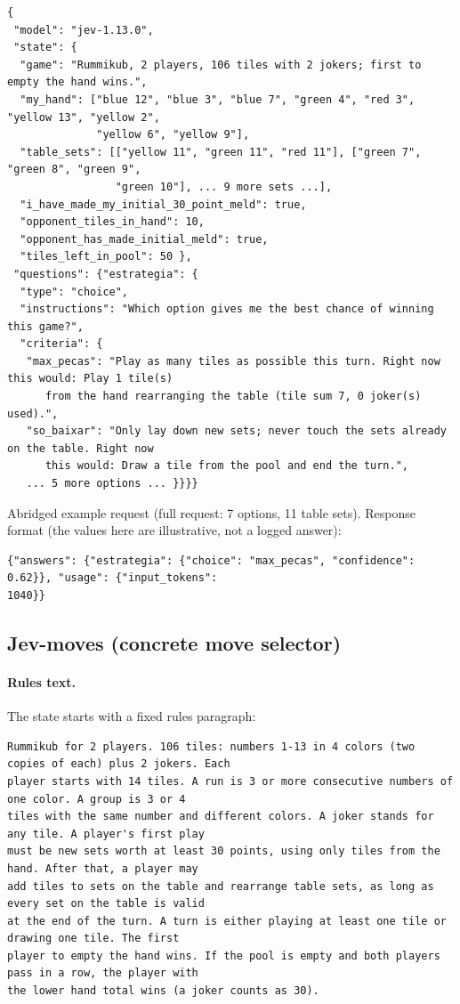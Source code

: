 {\scriptsize\begin{verbatim}
{
 "model": "jev-1.13.0",
 "state": {
  "game": "Rummikub, 2 players, 106 tiles with 2 jokers; first to empty the hand wins.",
  "my_hand": ["blue 12", "blue 3", "blue 7", "green 4", "red 3", "yellow 13", "yellow 2",
              "yellow 6", "yellow 9"],
  "table_sets": [["yellow 11", "green 11", "red 11"], ["green 7", "green 8", "green 9",
                 "green 10"], ... 9 more sets ...],
  "i_have_made_my_initial_30_point_meld": true,
  "opponent_tiles_in_hand": 10,
  "opponent_has_made_initial_meld": true,
  "tiles_left_in_pool": 50 },
 "questions": {"estrategia": {
  "type": "choice",
  "instructions": "Which option gives me the best chance of winning this game?",
  "criteria": {
   "max_pecas": "Play as many tiles as possible this turn. Right now this would: Play 1 tile(s)
      from the hand rearranging the table (tile sum 7, 0 joker(s) used).",
   "so_baixar": "Only lay down new sets; never touch the sets already on the table. Right now
      this would: Draw a tile from the pool and end the turn.",
   ... 5 more options ... }}}}
\end{verbatim}}
\noindent Abridged example request (full request: 7 options, 11 table sets). Response format (the values here are illustrative, not a logged answer):
{\scriptsize\begin{verbatim}
{"answers": {"estrategia": {"choice": "max_pecas", "confidence": 0.62}}, "usage": {"input_tokens":
1040}}
\end{verbatim}}

\subsection{Jev-moves (concrete move selector)}
\paragraph{Rules text.} The state starts with a fixed rules paragraph:
{\scriptsize\begin{verbatim}
Rummikub for 2 players. 106 tiles: numbers 1-13 in 4 colors (two copies of each) plus 2 jokers. Each
player starts with 14 tiles. A run is 3 or more consecutive numbers of one color. A group is 3 or 4
tiles with the same number and different colors. A joker stands for any tile. A player's first play
must be new sets worth at least 30 points, using only tiles from the hand. After that, a player may
add tiles to sets on the table and rearrange table sets, as long as every set on the table is valid
at the end of the turn. A turn is either playing at least one tile or drawing one tile. The first
player to empty the hand wins. If the pool is empty and both players pass in a row, the player with
the lower hand total wins (a joker counts as 30).
\end{verbatim}}
